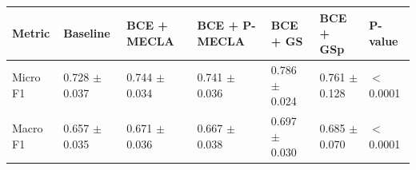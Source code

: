 \begin{tabular}{lllllll}
\toprule
Metric & Baseline & BCE + MECLA & BCE + P-MECLA & BCE + GS & BCE + GSp & P-value \\
\midrule
Micro F1 & 0.728 $\pm$ 0.037 & 0.744 $\pm$ 0.034 & 0.741 $\pm$ 0.036 & 0.786 $\pm$ 0.024 & 0.761 $\pm$ 0.128 & $<$0.0001 \\
Macro F1 & 0.657 $\pm$ 0.035 & 0.671 $\pm$ 0.036 & 0.667 $\pm$ 0.038 & 0.697 $\pm$ 0.030 & 0.685 $\pm$ 0.070 & $<$0.0001 \\
\bottomrule
\end{tabular}
